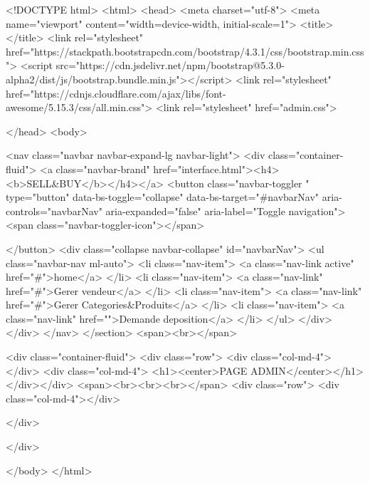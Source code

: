 <!DOCTYPE html>
<html>
<head>
	<meta charset="utf-8">
	<meta name="viewport" content="width=device-width, initial-scale=1">
	<title></title>
	<link rel="stylesheet" href="https://stackpath.bootstrapcdn.com/bootstrap/4.3.1/css/bootstrap.min.css">
  <script src="https://cdn.jsdelivr.net/npm/bootstrap@5.3.0-alpha2/dist/js/bootstrap.bundle.min.js"></script>
  <link rel="stylesheet" href="https://cdnjs.cloudflare.com/ajax/libs/font-awesome/5.15.3/css/all.min.css">
  <link rel="stylesheet" href="admin.css">

</head>
<body>

<nav class="navbar navbar-expand-lg navbar-light">
  <div class="container-fluid">
    <a class="navbar-brand" href="interface.html"><h4><b>SELL&BUY</b></h4></a>
    <button class="navbar-toggler " type="button" data-bs-toggle="collapse" data-bs-target="#navbarNav" aria-controls="navbarNav" aria-expanded="false" aria-label="Toggle navigation">
      <span class="navbar-toggler-icon"></span>
      
    </button>
    <div class="collapse navbar-collapse" id="navbarNav">
      <ul class="navbar-nav ml-auto">
          <li class="nav-item">
          <a class="nav-link active" href="#">home</a>
        </li>
        <li class="nav-item">
          <a class="nav-link" href="#">Gerer vendeur</a>
        </li>
        <li class="nav-item">
          <a class="nav-link" href="#">Gerer Categories&Produits</a>
        </li>
        <li class="nav-item">
          <a class="nav-link" href="">Demande deposition</a>
        </li>        
      </ul>
    </div>
  </div>
</nav>
</section>
<span><br></span>

<div class="container-fluid">
	<div class="row">
		<div class="col-md-4"></div>
			<div class="col-md-4"> <h1><center>PAGE ADMIN</center></h1>
			</div></div>
	<span><br><br><br></span>
	<div class="row">
		<div class="col-md-4"></div>


	</div>

</div>


</body>
</html>